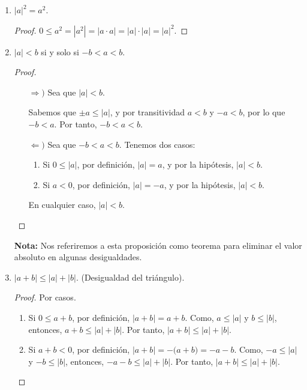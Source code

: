 \documentclass[11pt]{article}
\begin{document}
\begin{enumerate}[label=\alph*)]
\item $|a|^2=a^2$.
\vspace{-1em}\begin{proof} 
    $0 \leq a^2 = |a^2|= |a\cdot a|=|a| \cdot |a|= |a|^2$. \qedhere
\end{proof} \vspace{-1em}

\item $|a|<b$ si y solo si $-b<a<b$.

\vspace{-1em}\begin{proof} \leavevmode
    \begin{itemize}
        \item[$\Rightarrow)$] Sea que $|a|<b$.
        
        Sabemos que $\pm a \leq |a|$, y por transitividad $a<b$ y $-a<b$, por lo que $-b<a$. Por tanto, $-b<a<b$.
        \item[$\Leftarrow)$] Sea que $-b<a<b$. Tenemos dos casos: \begin{enumerate}[label=\roman*)]
            \item Si $0\leq |a|$, por definición, $|a|=a$, y por la hipótesis, $|a|<b$.
            \item Si $a<0$, por definición, $|a|=-a$, y por la hipótesis, $|a|<b$.
        \end{enumerate} En cualquier caso, $|a|<b$. \qedhere 
    \end{itemize}
\end{proof} \vspace{-1em}

\textbf{Nota:} Nos referiremos a esta proposición como teorema para eliminar el valor absoluto en algunas desigualdades.

    \item $|a+b|\leq |a|+|b|$. (Desigualdad del triángulo).

    \vspace{-1em}\begin{proof} 
        Por casos.
        \begin{enumerate}[label=\roman*)]
            \item Si $0 \leq a+b$, por definición, $|a+b|=a+b$. Como, $a \leq |a|$ y $b \leq |b|$, entonces, $a+b \leq |a|+|b|$. Por tanto, $|a+b| \leq |a|+|b|$.
            \item Si $a+b<0$, por definición, $|a+b|=-\bigl(a+b\bigr)=-a-b$. Como, $-a \leq |a|$ y $-b \leq |b|$, entonces, $-a-b \leq |a|+|b|$. Por tanto, $|a+b| \leq |a|+|b|$. \qedhere
        \end{enumerate}    
    \end{proof} \vspace{-1em}
%


\end{enumerate}
\end{document}

